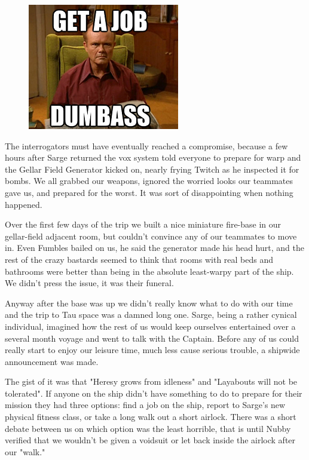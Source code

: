 \begin{figure}
	\begin{center}
		\includegraphics[width=\figwidth]{pics/10/9.png}
	\end{center}
\end{figure}
The interrogators must have eventually reached a compromise, because a few hours after Sarge returned the vox system told everyone to prepare for warp and the Gellar Field Generator kicked on, nearly frying Twitch as he inspected it for bombs. 
We all grabbed our weapons, ignored the worried looks our teammates gave us, and prepared for the worst. 
It was sort of disappointing when nothing happened.

Over the first few days of the trip we built a nice miniature fire-base in our gellar-field adjacent room, but couldn't convince any of our teammates to move in. 
Even Fumbles bailed on us, he said the generator made his head hurt, and the rest of the crazy bastards seemed to think that rooms with real beds and bathrooms were better than being in the absolute least-warpy part of the ship. 
We didn't press the issue, it was their funeral.

Anyway after the base was up we didn't really know what to do with our time and the trip to Tau space was a damned long one. 
Sarge, being a rather cynical individual, imagined how the rest of us would keep ourselves entertained over a several month voyage and went to talk with the Captain. 
Before any of us could really start to enjoy our leisure time, much less cause serious trouble, a shipwide announcement was made. 


The gist of it was that "Heresy grows from idleness" and "Layabouts will not be tolerated". 
If anyone on the ship didn't have something to do to prepare for their mission they had three options: 
find a job on the ship, report to Sarge's new physical fitness class, or take a long walk out a short airlock. 
There was a short debate between us on which option was the least horrible, that is until Nubby verified that we wouldn't be given a voidsuit or let back inside the airlock after our "walk."

